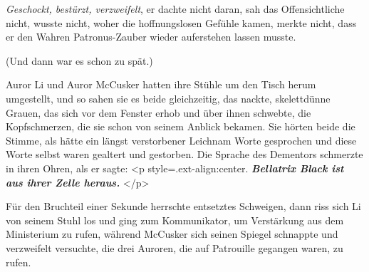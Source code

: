 \emph{Geschockt, bestürzt, verzweifelt}, er dachte nicht daran, sah das
Offensichtliche nicht, wusste nicht, woher die hoffnungslosen Gefühle kamen,
merkte nicht, dass er den Wahren Patronus-Zauber wieder auferstehen lassen
musste.

(Und dann war es schon zu spät.)

Auror Li und Auror McCusker hatten ihre Stühle um den Tisch herum umgestellt,
und so sahen sie es beide gleichzeitig, das nackte, skelettdünne Grauen, das
sich vor dem Fenster erhob und über ihnen schwebte, die Kopfschmerzen, die sie
schon von seinem Anblick bekamen. Sie hörten beide die Stimme, als hätte ein
längst verstorbener Leichnam Worte gesprochen und diese Worte selbst waren
gealtert und gestorben. Die Sprache des Dementors schmerzte in ihren Ohren, als
er sagte: <p style=\grqq{}.ext-align:center\grqq{}. \textbf{
}\textbf{\emph{\glqq Bellatrix Black ist aus ihrer Zelle heraus.\grqq{} }}</p>

Für den Bruchteil einer Sekunde herrschte entsetztes Schweigen, dann riss sich
Li von seinem Stuhl los und ging zum Kommunikator, um Verstärkung aus dem
Ministerium zu rufen, während McCusker sich seinen Spiegel schnappte und
verzweifelt versuchte, die drei Auroren, die auf Patrouille gegangen waren, zu
rufen.

